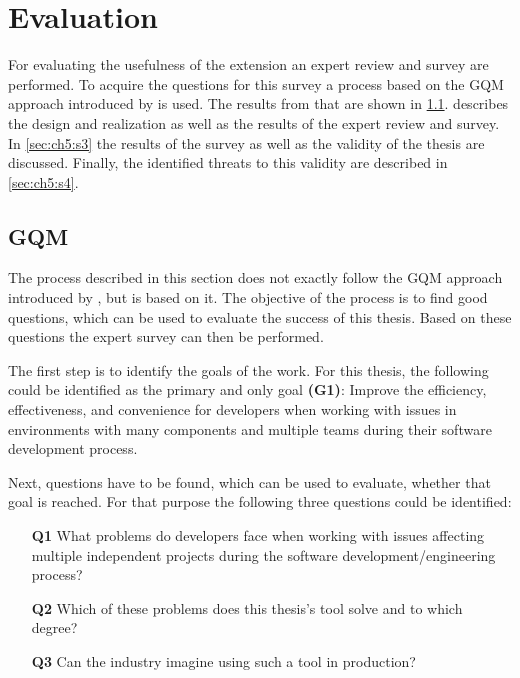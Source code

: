 
\chapter{Evaluation}
\label{chap:ch5}
For evaluating the usefulness of the extension an expert review and survey are performed.
To acquire the questions for this survey a process based on the \gls{GQM} approach introduced by \cite{caldiera1994goal} is used.
The results from that are shown in \cref{sec:ch5:s1}.
 describes the design and realization as well as the results of the expert review and survey.
In \cref{sec:ch5:s3} the results of the survey as well as the validity of the thesis are discussed.
Finally, the identified threats to this validity are described in \cref{sec:ch5:s4}.

\section{GQM}
\label{sec:ch5:s1}
The process described in this section does not exactly follow the \gls{GQM} approach introduced by \cite{caldiera1994goal},
but is based on it.
The objective of the process is to find good questions, which can be used to evaluate the success of this thesis.
Based on these questions the expert survey can then be performed.

The first step is to identify the goals of the work.
For this thesis, the following could be identified as the primary and only goal \textbf{(G1)}:
Improve the efficiency, effectiveness, and convenience for developers when working with issues in environments with many components and multiple teams during their software development process. 

Next, questions have to be found, which can be used to evaluate, whether that goal is reached.
For that purpose the following three questions could be identified:
\begin{itemize}
	\item[\textbf{Q1}] What problems do developers face when working with issues affecting multiple independent projects during the software development/engineering process?
	\item[\textbf{Q2}] Which of these problems does this thesis's tool solve and to which degree?
	\item[\textbf{Q3}] Can the industry imagine using such a tool in production?
\end{itemize}

